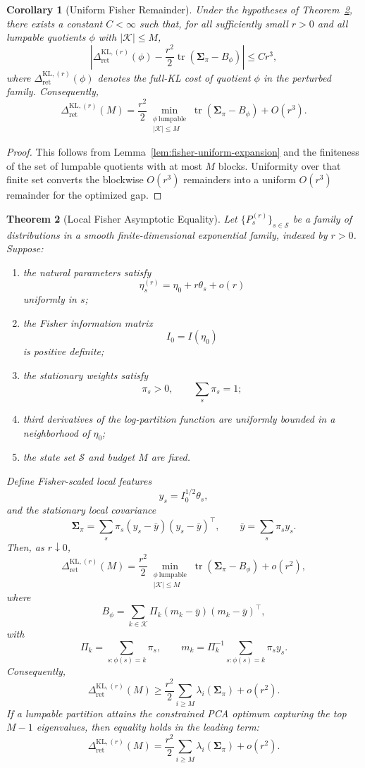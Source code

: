 \documentclass[12pt]{article}
\newtheorem{theorem}{Theorem}[section]
\newtheorem{corollary}[theorem]{Corollary}
\theoremstyle{definition}
\newcommand{\RetKLr}[1]{\Delta_{\mathrm{ret}}^{\mathrm{KL},(#1)}}
\begin{document}
\begin{corollary}[Uniform Fisher Remainder]
\label{cor:fisher-uniform-remainder}
Under the hypotheses of Theorem~\ref{thm:local-full-kl}, there exists a
constant $C<\infty$ such that, for all sufficiently small $r>0$ and all
lumpable quotients $\phi$ with $|\mathcal K|\le M$,
\[
\left|
\RetKLr{r}(\phi)
-
\frac{r^2}{2}
\operatorname{tr}(\bm{\Sigma}_\pi-B_\phi)
\right|
\le
C r^3,
\]
where $\RetKLr{r}(\phi)$ denotes the full-KL cost of quotient $\phi$ in the
perturbed family.  Consequently,
\[
\RetKLr{r}(M)
=
\frac{r^2}{2}
\min_{\substack{
\phi\ \text{lumpable}\\
|\mathcal K|\le M
}}
\operatorname{tr}(\bm{\Sigma}_\pi-B_\phi)
+
O(r^3).
\]
\end{corollary}

\begin{proof}
This follows from Lemma~\ref{lem:fisher-uniform-expansion} and the finiteness
of the set of lumpable quotients with at most $M$ blocks.  Uniformity over
that finite set converts the blockwise $O(r^3)$ remainders into a uniform
$O(r^3)$ remainder for the optimized gap.
\end{proof}

\begin{theorem}[Local Fisher Asymptotic Equality]
\label{thm:local-full-kl}
Let $\{P_s^{(r)}\}_{s\in\mathcal S}$ be a family of distributions in a smooth
finite-dimensional exponential family, indexed by $r>0$.  Suppose:
\begin{enumerate}[label=(\arabic*)]
\item the natural parameters satisfy
\[
\eta_s^{(r)}
=
\eta_0+r\theta_s+o(r)
\]
uniformly in $s$;
\item the Fisher information matrix
\[
I_0=I(\eta_0)
\]
is positive definite;
\item the stationary weights satisfy
\[
\pi_s>0,
\qquad
\sum_s\pi_s=1;
\]
\item third derivatives of the log-partition function are uniformly bounded in
a neighborhood of $\eta_0$;
\item the state set $\mathcal S$ and budget $M$ are fixed.
\end{enumerate}
Define Fisher-scaled local features
\[
y_s=I_0^{1/2}\theta_s,
\]
and the stationary local covariance
\[
\bm{\Sigma}_\pi
=
\sum_s
\pi_s
(y_s-\bar y)(y_s-\bar y)^\top,
\qquad
\bar y=\sum_s\pi_s y_s.
\]
Then, as $r\downarrow0$,
\[
\RetKLr{r}(M)
=
\frac{r^2}{2}
\min_{\substack{
\phi\ \text{lumpable}\\
|\mathcal K|\le M
}}
\operatorname{tr}(\bm{\Sigma}_\pi-B_\phi)
+
o(r^2),
\]
where
\[
B_\phi
=
\sum_{k\in\mathcal K}
\Pi_k
(m_k-\bar y)(m_k-\bar y)^\top,
\]
with
\[
\Pi_k=\sum_{s:\phi(s)=k}\pi_s,
\qquad
m_k=\Pi_k^{-1}\sum_{s:\phi(s)=k}\pi_s y_s.
\]
Consequently,
\[
\RetKLr{r}(M)
\ge
\frac{r^2}{2}
\sum_{i\ge M}
\lambda_i(\bm{\Sigma}_\pi)
+
o(r^2).
\]
If a lumpable partition attains the constrained PCA optimum capturing the top
$M-1$ eigenvalues, then equality holds in the leading term:
\[
\RetKLr{r}(M)
=
\frac{r^2}{2}
\sum_{i\ge M}
\lambda_i(\bm{\Sigma}_\pi)
+
o(r^2).
\]
\end{theorem}
\end{document}
